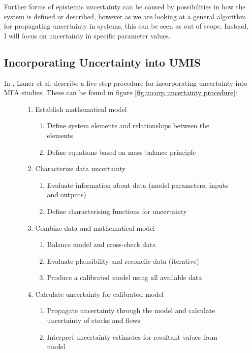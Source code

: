 \documentclass[ %
                    author={Tom Jager},
                supervisor={Dr. Daniel Schien},
                    degree={MEng},
                     title={A Bayesian Inference Engine for UMIS Structured Data},
                  subtitle={},
                      type={research},
                      year={2019} ]{dissertation}
\begin{document}
Further forms of epistemic uncertainty can be caused by possibilities in how the system is defined or described, however as we are looking at a general algorithm for propagating uncertainty in systems, this can be seen as out of scope. Instead, I will focus on uncertainty in specific parameter values.

\subsection{Incorporating Uncertainty into UMIS}
\label{sec:incorporating_uncertainty}
In \cite{laner2014systematic}, Laner et al. describe a five step procedure for incorporating uncertainty into MFA studies. These can be found in figure \ref{fig:incorp uncertainty procedure}:

\begin{figure}[t]
    \begin{enumerate}
        \item Establish mathematical model
        \begin{enumerate}
            \item Define system elements and relationships between the elements
            \item Define equations based on mass balance principle
        \end{enumerate}
        
        \item Characterize data uncertainty
        \begin{enumerate}
            \item Evaluate information about data (model parameters, inputs and outputs)
            \item Define characterising functions for uncertainty
        \end{enumerate}
        
        \item Combine data and mathematical model
        \begin{enumerate}
            \item Balance model and cross-check data
            \item Evaluate plausibility and reconcile data (iterative)
            \item Produce a calibrated model using all available data
        \end{enumerate}
        
        \item Calculate uncertainty for calibrated model
        \begin{enumerate}
            \item Propagate uncertainty through the model and calculate uncertainty of stocks and flows
            \item Interpret uncertainty estimates for resultant values from model 
        \end{enumerate}
        

\end{enumerate}
\end{figure}
\end{document}
